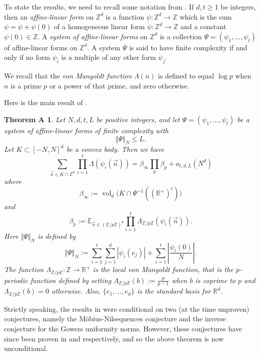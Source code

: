 \documentclass[12pt]{amsart}
\numberwithin{equation}{section}  %
\theoremstyle{remark}
\theoremstyle{plain}
\newtheorem*{gt-maintheorem}{Theorem A \cite[Main Theorem]{gt-linearprimes}}
\numberwithin{equation}{section}
\newcommand{\Z}{\mathbb{Z}}
\newcommand{\R}{\mathbb{R}}
\newcommand{\E}{\mathbb{E}}  %
\renewcommand{\leq}{\leqslant}
\renewcommand{\geq}{\geqslant}
\renewcommand{\(}{\left(}
\renewcommand{\)}{\right)}
\newcommand{\vect}[1]{{\ensuremath{\vec{#1}}}}
\newcommand{\vol}{\operatorname{vol}}
\begin{document}
To state the results, we need to recall some notation from \cite{gt-linearprimes}.  If $d,t \geq 1$ be integers, then an \emph{affine-linear form} on $\Z^d$ is a function $\psi: \Z^d \to \Z$ which is the sum $\psi = \dot \psi + \psi(0)$ of a homogeneous linear form $\dot \psi: \Z^d \to \Z$ and a constant $\psi(0) \in \Z$.  A \emph{system of affine-linear forms} on $\Z^d$ is a collection $\Psi = (\psi_1,\ldots,\psi_t)$ of affine-linear forms on $\Z^d$. 
A system $\Psi$ is said to have finite complexity if and only if no form $\dot\psi_i$ is a multiple of any other form $\dot\psi_j$. 


We recall that the \emph{von Mangoldt function} $\Lambda(n)$ is defined to equal $\log p$ when $n$ is a prime $p$ or a power of that prime, and zero otherwise.

Here is the main result of \cite{gt-linearprimes}.

\begin{gt-maintheorem}
  Let $N, d, t, L$ be positive integers, and let $\Psi = (\psi_1,\ldots,\psi_t)$ be a system of affine-linear forms of finite complexity with 
\begin{equation}\label{size-assumption}\Vert \Psi \Vert_N \leq L.  \end{equation}
Let $K \subset [-N,N]^d$ be a convex body.  Then we have
\begin{equation}\label{dickson-eq}
\sum_{ \vect{n} \in K \cap \Z^d} \prod_{i=1}^t \Lambda( \psi_i( \vect{n}) ) = \beta_\infty \prod_p \beta_p + o_{t,d,L}(N^d)
\end{equation}
where 
\[ \beta_{\infty} := \vol_d\big( K \cap \Psi^{-1}((\R^+)^t) \big)\]
and
\[ \beta_p := \E_{\vect{n} \in (\Z/p\Z)^d} \prod_{i=1}^t \Lambda_{\Z/p\Z}(\psi_i(\vect{n})).\]
Here $\Vert \Psi \Vert_N$ is defined by
\[ \Vert \Psi \Vert_N := \sum_{i=1}^t \sum_{j = 1}^d |\dot{\psi_i}(e_j)|  + \sum_{i = 1}^t \left|\frac{\psi_i(0)}{N}\right|.\]
The function $\Lambda_{\Z/p\Z}: \Z \to \R^+$ is the \emph{local von Mangoldt function}, that is the $p$-periodic function defined by setting $\Lambda_{\Z/p\Z}(b) := \frac{p}{p-1}$ when $b$ is coprime to $p$ and $\Lambda_{\Z/p\Z}(b) = 0$ otherwise.  Also, $\{e_1,\ldots,e_d\}$ is the standard basis for $\R^d$.
\end{gt-maintheorem}

Strictly speaking, the results in \cite{gt-linearprimes} were conditional on two (at the time unproven) conjectures, namely the M\"obius-Nilsequences conjecture and the inverse conjecture for the Gowers uniformity norms.  However, these conjectures have since been proven in \cite{gt-nilmobius} and \cite{GTZ} respectively, and so the above theorem is now unconditional.
\end{document}
